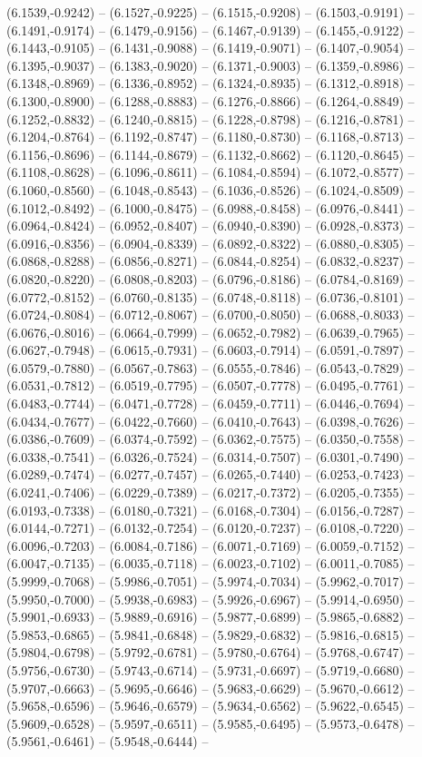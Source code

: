 (6.1539,-0.9242) -- (6.1527,-0.9225) -- (6.1515,-0.9208) -- (6.1503,-0.9191) -- (6.1491,-0.9174) -- (6.1479,-0.9156) -- (6.1467,-0.9139) -- (6.1455,-0.9122) -- (6.1443,-0.9105) -- (6.1431,-0.9088) -- (6.1419,-0.9071) -- (6.1407,-0.9054) -- (6.1395,-0.9037) -- (6.1383,-0.9020) -- (6.1371,-0.9003) -- (6.1359,-0.8986) -- (6.1348,-0.8969) -- (6.1336,-0.8952) -- (6.1324,-0.8935) -- (6.1312,-0.8918) -- (6.1300,-0.8900) -- (6.1288,-0.8883) -- (6.1276,-0.8866) -- (6.1264,-0.8849) -- (6.1252,-0.8832) -- (6.1240,-0.8815) -- (6.1228,-0.8798) -- (6.1216,-0.8781) -- (6.1204,-0.8764) -- (6.1192,-0.8747) -- (6.1180,-0.8730) -- (6.1168,-0.8713) -- (6.1156,-0.8696) -- (6.1144,-0.8679) -- (6.1132,-0.8662) -- (6.1120,-0.8645) -- (6.1108,-0.8628) -- (6.1096,-0.8611) -- (6.1084,-0.8594) -- (6.1072,-0.8577) -- (6.1060,-0.8560) -- (6.1048,-0.8543) -- (6.1036,-0.8526) -- (6.1024,-0.8509) -- (6.1012,-0.8492) -- (6.1000,-0.8475) -- (6.0988,-0.8458) -- (6.0976,-0.8441) -- (6.0964,-0.8424) -- (6.0952,-0.8407) -- (6.0940,-0.8390) -- (6.0928,-0.8373) -- (6.0916,-0.8356) -- (6.0904,-0.8339) -- (6.0892,-0.8322) -- (6.0880,-0.8305) -- (6.0868,-0.8288) -- (6.0856,-0.8271) -- (6.0844,-0.8254) -- (6.0832,-0.8237) -- (6.0820,-0.8220) -- (6.0808,-0.8203) -- (6.0796,-0.8186) -- (6.0784,-0.8169) -- (6.0772,-0.8152) -- (6.0760,-0.8135) -- (6.0748,-0.8118) -- (6.0736,-0.8101) -- (6.0724,-0.8084) -- (6.0712,-0.8067) -- (6.0700,-0.8050) -- (6.0688,-0.8033) -- (6.0676,-0.8016) -- (6.0664,-0.7999) -- (6.0652,-0.7982) -- (6.0639,-0.7965) -- (6.0627,-0.7948) -- (6.0615,-0.7931) -- (6.0603,-0.7914) -- (6.0591,-0.7897) -- (6.0579,-0.7880) -- (6.0567,-0.7863) -- (6.0555,-0.7846) -- (6.0543,-0.7829) -- (6.0531,-0.7812) -- (6.0519,-0.7795) -- (6.0507,-0.7778) -- (6.0495,-0.7761) -- (6.0483,-0.7744) -- (6.0471,-0.7728) -- (6.0459,-0.7711) -- (6.0446,-0.7694) -- (6.0434,-0.7677) -- (6.0422,-0.7660) -- (6.0410,-0.7643) -- (6.0398,-0.7626) -- (6.0386,-0.7609) -- (6.0374,-0.7592) -- (6.0362,-0.7575) -- (6.0350,-0.7558) -- (6.0338,-0.7541) -- (6.0326,-0.7524) -- (6.0314,-0.7507) -- (6.0301,-0.7490) -- (6.0289,-0.7474) -- (6.0277,-0.7457) -- (6.0265,-0.7440) -- (6.0253,-0.7423) -- (6.0241,-0.7406) -- (6.0229,-0.7389) -- (6.0217,-0.7372) -- (6.0205,-0.7355) -- (6.0193,-0.7338) -- (6.0180,-0.7321) -- (6.0168,-0.7304) -- (6.0156,-0.7287) -- (6.0144,-0.7271) -- (6.0132,-0.7254) -- (6.0120,-0.7237) -- (6.0108,-0.7220) -- (6.0096,-0.7203) -- (6.0084,-0.7186) -- (6.0071,-0.7169) -- (6.0059,-0.7152) -- (6.0047,-0.7135) -- (6.0035,-0.7118) -- (6.0023,-0.7102) -- (6.0011,-0.7085) -- (5.9999,-0.7068) -- (5.9986,-0.7051) -- (5.9974,-0.7034) -- (5.9962,-0.7017) -- (5.9950,-0.7000) -- (5.9938,-0.6983) -- (5.9926,-0.6967) -- (5.9914,-0.6950) -- (5.9901,-0.6933) -- (5.9889,-0.6916) -- (5.9877,-0.6899) -- (5.9865,-0.6882) -- (5.9853,-0.6865) -- (5.9841,-0.6848) -- (5.9829,-0.6832) -- (5.9816,-0.6815) -- (5.9804,-0.6798) -- (5.9792,-0.6781) -- (5.9780,-0.6764) -- (5.9768,-0.6747) -- (5.9756,-0.6730) -- (5.9743,-0.6714) -- (5.9731,-0.6697) -- (5.9719,-0.6680) -- (5.9707,-0.6663) -- (5.9695,-0.6646) -- (5.9683,-0.6629) -- (5.9670,-0.6612) -- (5.9658,-0.6596) -- (5.9646,-0.6579) -- (5.9634,-0.6562) -- (5.9622,-0.6545) -- (5.9609,-0.6528) -- (5.9597,-0.6511) -- (5.9585,-0.6495) -- (5.9573,-0.6478) -- (5.9561,-0.6461) -- (5.9548,-0.6444) -- 